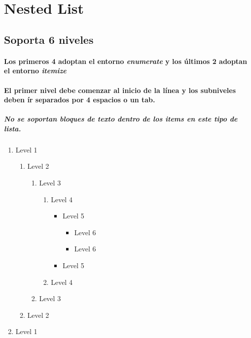 \documentclass{article}
\begin{document}
	\section*{Nested List}

	\subsection*{Soporta 6 niveles}

	\paragraph{Los primeros 4 adoptan el entorno \textit{enumerate} y los \'ultimos 2 adoptan el entorno \textit{itemize}}

	\paragraph{El primer nivel debe comenzar al inicio de la l\'inea y los subniveles deben \'ir separados por 4 espacios o un tab.}

	\subparagraph{No se soportan bloques de texto dentro de los items en este tipo de lista.}
	\begin{enumerate}
		\item Level 1
		\begin{enumerate}
			\item Level 2
			\begin{enumerate}
				\item Level 3
				\begin{enumerate}
					\item Level 4
					\begin{itemize}
						\item Level 5
						\begin{itemize}
							\item Level 6
							\item Level 6
						\end{itemize}
						\item Level 5
					\end{itemize}
					\item Level 4
				\end{enumerate}
				\item Level 3
			\end{enumerate}
			\item Level 2
		\end{enumerate}
		\item Level 1
	\end{enumerate}
	\newpage
\end{document}
